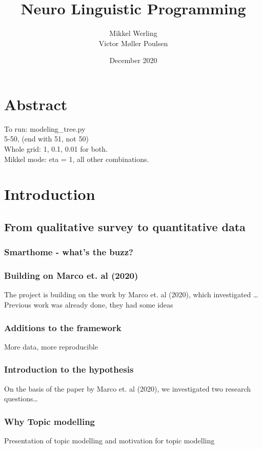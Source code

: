 \documentclass{article}
\title{Neuro Linguistic Programming}
\author{Mikkel Werling \\ Victor Møller Poulsen}
\date{December 2020}
\begin{document}
    \maketitle
    \section{Abstract}
    To run: modeling\_tree.py\\
    5-50, (end with 51, not 50)\\
    Whole grid: 1, 0.1, 0.01 for both. \\
    Mikkel mode: eta = 1, all other combinations. \\

    \section{Introduction}
    \subsection{From qualitative survey to quantitative data}
    \subsubsection{Smarthome - what's the buzz?}
    \subsubsection{Building on Marco et. al (2020)}
    The project is building on the work by Marco et. al (2020), which investigated \dots \\
    Previous work was already done, they had some ideas
    \subsubsection{Additions to the framework}
    More data, more reproducible
    \subsubsection{Introduction to the hypothesis}
    On the basis of the paper by Marco et. al (2020), we investigated two research questions\dots
    


    \subsubsection{Why Topic modelling}
    Presentation of topic modelling and motivation for topic modelling
\end{document}
